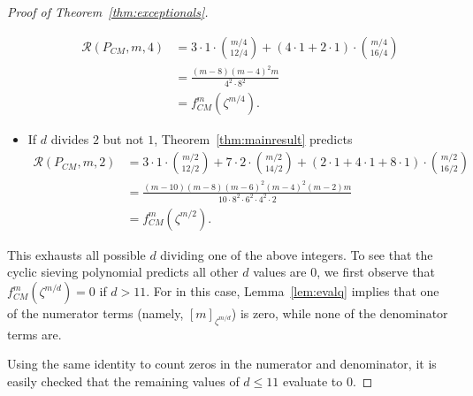 \documentclass[12pt]{amsart}
\theoremstyle{definition}
\theoremstyle{remark}
\numberwithin{equation}{section}
\begin{document}
\begin{proof}[Proof of Theorem~\ref{thm:exceptionals}]
\begin{itemize}
\begin{align*}
\mathcal{R}(P_{CM},m,4) &= 3 \cdot 1 \cdot \binom{m/4}{12/4} + (4 \cdot 1 + 2 \cdot 1) \cdot \binom{m/4}{16/4}  \\
&= \frac{(m-8)(m-4)^2m}{4^2 \cdot 8^2} \\
&= f_{CM}^m(\zeta^{m/4}).
\end{align*}
\item If $d$ divides $2$ but not $1$, Theorem~\ref{thm:mainresult} predicts
\begin{align*}
\mathcal{R}(P_{CM},m,2) &= 3 \cdot 1 \cdot \binom{m/2}{12/2} + 7 \cdot 2 \cdot \binom{m/2}{14/2} + (2 \cdot 1 + 4 \cdot 1 + 8 \cdot 1) \cdot \binom{m/2}{16/2} \\
&= \frac{(m-10)(m-8)(m-6)^2(m-4)^2(m-2)m}{10 \cdot 8^2 \cdot 6^2 \cdot  4^2 \cdot 2}\\
&= f_{CM}^m(\zeta^{m/2}).
\end{align*}
\end{itemize}
This exhausts all possible $d$ dividing one of the above integers. To see that the cyclic sieving polynomial predicts all other $d$ values are $0$, we first observe that $f^m_{CM}(\zeta^{m/d}) = 0$ if $d > 11$. For in this case, Lemma~\ref{lem:evalq} implies that one of the numerator terms (namely, $[m]_{\zeta^{m/d}}$) is zero, while none of the denominator terms are. 

Using the same identity to count zeros in the numerator and denominator, it is easily checked that the remaining values of $d \leq 11$ evaluate to $0$. 
\end{proof}
\end{document}
